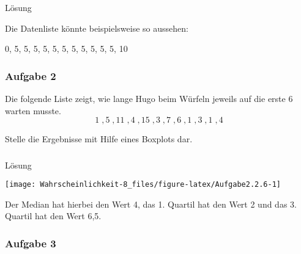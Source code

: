 \documentclass[
  ngerman,
]{book}
\begin{document}
\hypertarget{section-33}{%
\subsubsection*{}\label{section-33}}

Lösung

Die Datenliste könnte beispielsweise so aussehen:

0, 5, 5, 5, 5, 5, 5, 5, 5, 5, 5, 5, 10

\hypertarget{section-34}{%
\subsubsection*{}\label{section-34}}

\hypertarget{aufgabe-2-4}{%
\subsubsection*{Aufgabe 2}\label{aufgabe-2-4}}

Die folgende Liste zeigt, wie lange Hugo beim Würfeln jeweils auf die erste 6 warten musste.
\[1\;, 5\;, 11\;, 4\;, 15\;, 3\;, 7\;, 6\;, 1\;, 3\;, 1\;, 4\]

Stelle die Ergebnisse mit Hilfe eines Boxplots dar.

\hypertarget{section-35}{%
\subsubsection*{}\label{section-35}}

Lösung

\begin{center}\texttt{[image: Wahrscheinlichkeit-8\_files/figure-latex/Aufgabe2.2.6-1]} \end{center}

Der Median hat hierbei den Wert 4, das 1. Quartil hat den Wert 2 und das 3. Quartil hat den Wert 6,5.

\hypertarget{section-36}{%
\subsubsection*{}\label{section-36}}

\hypertarget{aufgabe-3-1}{%
\subsubsection*{Aufgabe 3}\label{aufgabe-3-1}}
\end{document}
